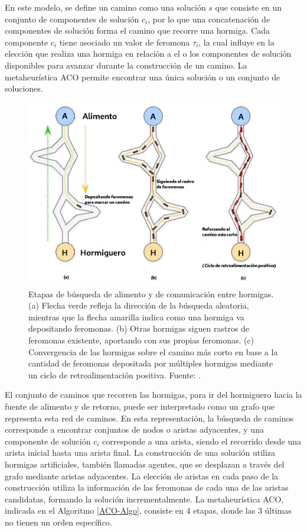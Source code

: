 En este modelo, se define un camino como una soluci\'on $s$ que consiste en un conjunto de componentes de soluci\'on $c_{i}$, por lo que una concatenaci\'on de componentes de soluci\'on forma el camino que recorre una hormiga. Cada componente $c_{i}$ tiene asociado un valor de feromona $\tau_i$, la cual influye en la elecci\'on que realiza una hormiga en relaci\'on a el o los componentes de soluci\'on disponibles para avanzar durante la construcci\'on de un camino. La metaheur\'istica ACO permite encontrar una \'unica soluci\'on o un conjunto de soluciones. 


\begin{figure}[h]
    \centering
    \includegraphics[scale=0.5]{imagenes/ACO-ant.png}
    \caption[Etapas de b\'usqueda de alimento y de comunicaci\'on entre hormigas.]{Etapas de b\'usqueda de alimento y de comunicaci\'on entre hormigas. (a) Flecha verde refleja la direcci\'on de la  b\'usqueda aleatoria, mientras que la flecha amarilla indica como una hormiga va depositando feromonas. (b) Otras hormigas siguen rastros de feromonas existente, aportando con sus propias feromonas. (c) Convergencia de las hormigas sobre el camino m\'as corto en base a la cantidad de feromonas depositada por m\'ultiples hormigas mediante un ciclo de retroalimentaci\'on positiva. Fuente: \citet{liu2020improving}.}
    \label{fig:hormigas}
\end{figure}

El conjunto de caminos que recorren las hormigas, para ir del hormiguero hacia la fuente de alimento y de retorno, puede ser interpretado como un grafo que representa esta red de caminos. En esta representaci\'on, la b\'usqueda de caminos corresponde a encontrar conjuntos de nodos o aristas adyacentes, y una componente de soluci\'on $c_{i}$ corresponde a una arista, siendo el recorrido desde una arista inicial hasta una arista final. La construcci\'on de una soluci\'on utiliza hormigas artificiales, tambi\'en llamadas agentes, que se desplazan a trav\'es del grafo mediante aristas adyacentes. La elecci\'on de aristas en cada paso de la construcci\'on utiliza la informaci\'on de las feromonas de cada una de las aristas candidatas, formando la soluci\'on incrementalmente. La metaheur\'istica ACO, indicada en el Algoritmo \ref{ACO-Algo}, consiste en 4 etapas, donde las 3 \'ultimas no tienen un orden espec\'ifico.

